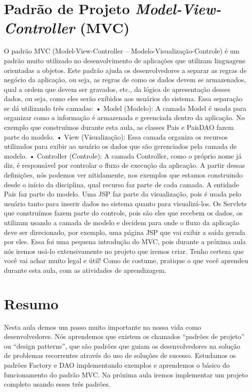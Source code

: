 \section{Padrão de Projeto \textit{Model-View-Controller} (MVC)}


O padrão MVC (Model-View-Controller – Modelo-Visualização-Controle) é um padrão muito utilizado no desenvolvimento de aplicações que utilizam linguagens orientadas a objetos. Este padrão ajuda os desenvolvedores a separar as regras de negócio da aplicação, ou seja, as regras de como os dados devem se armazenados, qual a ordem que devem ser gravados, etc., da lógica de apresentação desses dados, ou seja, como eles serão exibidos aos usuários do sistema. Essa separação se dá utilizando três camadas: 
•	Model (Modelo): A camada Model é usada para organizar como a informação é armazenada e gerenciada dentro da aplicação. No exemplo que construímos durante esta aula, as classes Pais e PaisDAO fazem parte do modelo.
•	View (Visualização): Essa camada organiza os recursos utilizados para exibir ao usuário os dados que são gerenciados pela camada de modelo.
•	Controller (Controle): A camada Controller, como o próprio nome já diz, é responsável por controlar o fluxo de execução da aplicação.
A partir dessas definições, nós podemos ver nitidamente, nos exemplos que estamos construindo desde o início da disciplina, qual recurso faz parte de cada camada. A entidade Pais faz parte do modelo. Uma JSP faz parte da visualização, pois é usada pelo usuário tanto para inserir dados no sistema quanto para visualizá-los. Os Servlets que construímos fazem parte do controle, pois são eles que recebem os dados, os utilizam usando a camada de modelo e decidem para onde o fluxo da aplicação deve ser direcionado, por exemplo, uma página JSP que vai exibir a saída gerada por eles.
Essa foi uma pequena introdução do MVC, pois durante a próxima aula nós iremos usá-lo extensivamente no projeto que iremos criar. Tenho certeza que você vai achar muito legal e útil! Como de costume, pratique o que você aprendeu durante esta aula, com as atividades de aprendizagem.



\section{Resumo}

Nesta aula demos um passo muito importante na nossa vida como desenvolvedores. Nós aprendemos que existem os chamados “padrões de projeto” ou “design patterns”, que são padrões que guiam os desenvolvedores na solução de problemas recorrentes através do uso de soluções de sucesso. Estudamos os padrões Factory e DAO implementando exemplos e aprendemos o básico do funcionamento do padrão MVC. Na próxima aula iremos implementar um projeto completo usando esses três padrões. 


